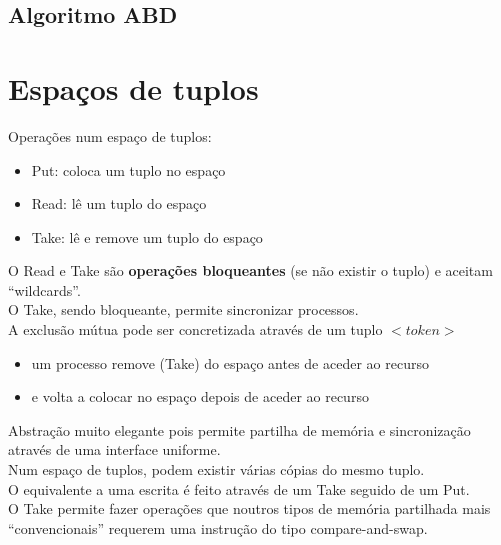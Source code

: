 \documentclass[12pt]{article}
\begin{document}
\subsection{Algoritmo ABD}



\newpage

\section{Espaços de tuplos}

Operações num espaço de tuplos:
\begin{itemize}[topsep=4pt, itemsep=0pt]
    \item Put: coloca um tuplo no espaço
    \item Read: lê um tuplo do espaço
    \item Take: lê e remove um tuplo do espaço
\end{itemize}

\vspace{10pt}
O Read e Take são \textbf{operações bloqueantes} (se não existir o
tuplo) e aceitam “wildcards”.\\

O Take, sendo bloqueante, permite sincronizar processos.\\

A exclusão mútua pode ser concretizada através de um tuplo $<token>$
\begin{itemize}[topsep=0pt, itemsep=0pt]
    \item um processo remove (Take) do espaço antes de aceder ao recurso
    \item e volta a colocar no espaço depois de aceder ao recurso\\
\end{itemize}

Abstração muito elegante pois permite partilha de memória e sincronização através de uma interface uniforme.\\

Num espaço de tuplos, podem existir várias cópias do mesmo tuplo.\\

O equivalente a uma escrita é feito através de um Take seguido de um Put.\\

O Take permite fazer operações que noutros tipos de memória partilhada mais “convencionais” requerem uma instrução do tipo compare-and-swap. \\
\end{document}
